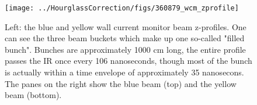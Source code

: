 \begin{figure}
\begin{center}
\texttt{[image: ../HourglassCorrection/figs/360879\_wcm\_zprofile]}
\caption{ 
Left: the blue and yellow wall current monitor beam z-profiles. One can see the
three beam buckets which make up one so-called "filled bunch". Bunches are
approximately 1000 cm long, the entire profile passes the IR once every 106
nanoseconds, though most of the bunch is actually within a time envelope of
approximately 35 nanosecons. The panes on the right show the blue beam (top)
and the yellow beam (bottom).
}
\label{fig:360879_wcm_zprofile}
\end{center}
\end{figure}
